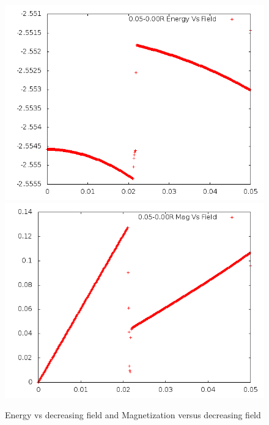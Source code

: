 \documentclass{article}
\begin{document}
\begin{figure}[h]
 \centering 
\includegraphics[scale=0.3]{E005to000R.png}
\includegraphics[scale=0.3]{M005to000R.png}
\caption{Energy vs decreasing field and Magnetization versus decreasing field}
\end{figure}
\end{document}
